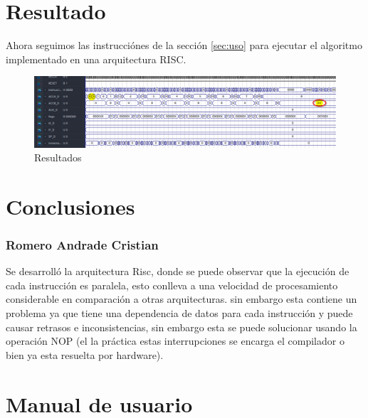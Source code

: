 \documentclass{IEEEtran}
\begin{document}
\section{Resultado}
\label{sec:orgcc271b6}
Ahora seguimos las instrucciónes de la sección \ref{sec:uso} para ejecutar el algoritmo implementado en una arquitectura RISC.
\begin{figure}[htbp]
\centering
\includegraphics[width=.9\linewidth]{../img/7.png}
\caption{Resultados}
\end{figure}
\section{Conclusiones}
\label{sec:orga38d001}
\subsubsection{Romero Andrade Cristian}
\label{sec:org13c4ec7}
Se desarrolló la arquitectura Risc, donde se puede observar que la ejecución de cada instrucción es paralela, esto conlleva a una velocidad de procesamiento considerable en comparación a otras arquitecturas. sin embargo esta contiene un problema ya que tiene una dependencia de datos para cada instrucción y puede causar retrasos e inconsistencias, sin embargo esta se puede solucionar usando la operación NOP (el la práctica estas interrupciones se encarga el compilador o bien ya esta resuelta por hardware).
\section{Manual de usuario}
\label{sec:org2f4f6ab}
\end{document}
